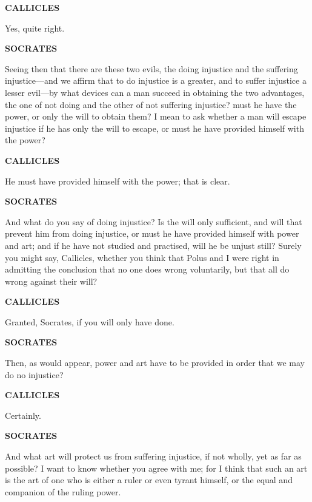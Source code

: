 \documentclass[11pt,letter]{article}
\begin{document}
\par \textbf{CALLICLES}
\par   Yes, quite right.

\par \textbf{SOCRATES}
\par   Seeing then that there are these two evils, the doing injustice and the suffering injustice—and we affirm that to do injustice is a greater, and to suffer injustice a lesser evil—by what devices can a man succeed in obtaining the two advantages, the one of not doing and the other of not suffering injustice? must he have the power, or only the will to obtain them? I mean to ask whether a man will escape injustice if he has only the will to escape, or must he have provided himself with the power?

\par \textbf{CALLICLES}
\par   He must have provided himself with the power; that is clear.

\par \textbf{SOCRATES}
\par   And what do you say of doing injustice? Is the will only sufficient, and will that prevent him from doing injustice, or must he have provided himself with power and art; and if he have not studied and practised, will he be unjust still? Surely you might say, Callicles, whether you think that Polus and I were right in admitting the conclusion that no one does wrong voluntarily, but that all do wrong against their will?

\par \textbf{CALLICLES}
\par   Granted, Socrates, if you will only have done.

\par \textbf{SOCRATES}
\par   Then, as would appear, power and art have to be provided in order that we may do no injustice?

\par \textbf{CALLICLES}
\par   Certainly.

\par \textbf{SOCRATES}
\par   And what art will protect us from suffering injustice, if not wholly, yet as far as possible? I want to know whether you agree with me; for I think that such an art is the art of one who is either a ruler or even tyrant himself, or the equal and companion of the ruling power.
\end{document}
